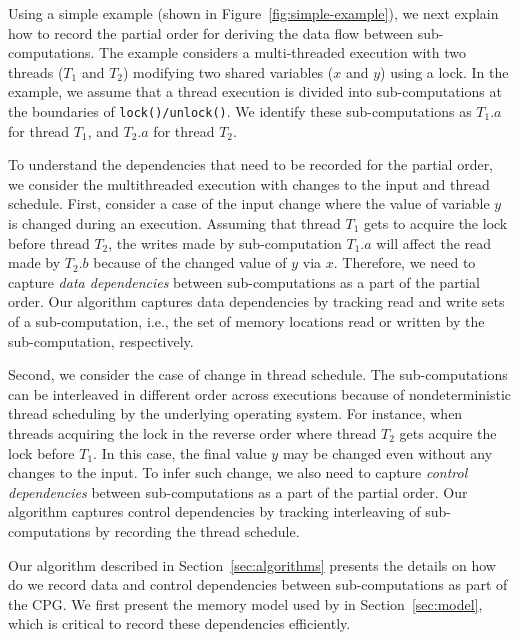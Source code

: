 Using a simple example (shown in Figure~\ref{fig:simple-example}), we next explain how to record  the partial order for deriving the data flow between sub-computations. The example considers a multi-threaded execution with two threads ($T_1$ and $T_2$) modifying two shared variables ($x$ and $y$) using a lock. In the example, we assume that a thread execution is divided into sub-computations at the boundaries of {\tt lock()/unlock()}. We identify these sub-computations as $T_1.a$ for thread $T_1$, and $T_2.a$ for thread $T_2$.  



To understand the dependencies that need to be recorded for the partial order, we consider the multithreaded execution with changes to the input and thread schedule.  First, consider a case of the input change where the value of variable $y$ is changed during an execution. Assuming that thread $T_1$ gets to acquire the lock before thread $T_2$, the writes made by sub-computation $T_1.a$ will affect the read made by $T_2.b$ because of the changed value of $y$ via  $x$. Therefore, we need to capture {\em data dependencies} between sub-computations as a part of the partial order. Our algorithm captures data dependencies by tracking read and write sets of a sub-computation, i.e., the set of memory locations read or written by the sub-computation, respectively.

Second, we consider the case of change in thread schedule. The sub-computations can be interleaved in different order across executions because of nondeterministic thread scheduling by the underlying operating system. For instance, when threads acquiring the lock in the reverse order where thread $T_2$ gets acquire the lock before $T_1$. In this case, the final value $y$ may be changed even without any changes to the input. To infer such change, we also need to capture {\em control dependencies}   between sub-computations as a part of the partial order. Our algorithm captures control dependencies by tracking interleaving of sub-computations by recording the thread schedule. 





Our algorithm described in Section~\ref{sec:algorithms} presents the details on how do we record data and control dependencies between sub-computations as part of the CPG. We first present the memory model used by \projecttitle in Section~\ref{sec:model}, which is critical to record these dependencies efficiently.














 
